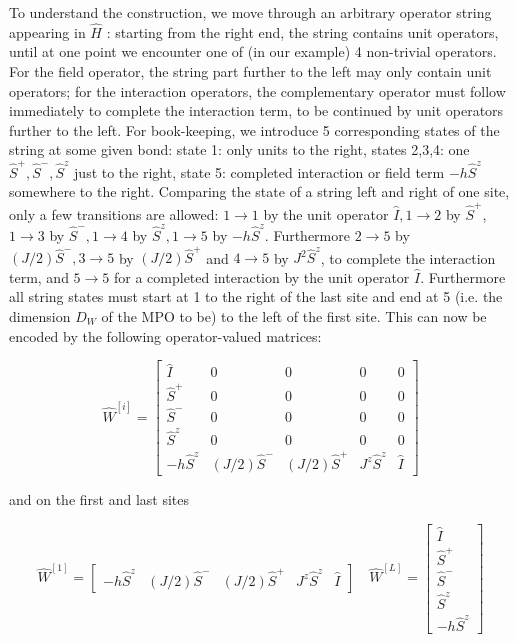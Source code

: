 \documentclass[12pt]{article}
\begin{document}
To understand the construction, we move through an arbitrary operator string appearing in $\hat{H}$ : starting from the right end, the string contains unit operators, until at one point we encounter one of (in our example) 4 non-trivial operators. For the field operator, the string part further to the left may only contain unit operators; for the interaction operators, the complementary operator must follow immediately to complete the interaction term, to be continued by unit operators further to the left. For book-keeping, we introduce 5 corresponding states of the string at some given bond: state 1: only units to the right, states 2,3,4: one $\hat{S}^{+}, \hat{S}^{-}, \hat{S}^{z}$ just to the right, state 5: completed interaction or field term $-h \hat{S}^{z}$ somewhere to the right. Comparing the state of a string left and right of one site, only a few transitions are allowed: $1 \rightarrow 1$ by the unit operator $\hat{I}, 1 \rightarrow 2$ by $\hat{S}^{+}$, $1 \rightarrow 3$ by $\hat{S}^{-}, 1 \rightarrow 4$ by $\hat{S}^{z}, 1 \rightarrow 5$ by $-h \hat{S}^{z}$. Furthermore $2 \rightarrow 5$ by $(J / 2) \hat{S}^{-}, 3 \rightarrow 5$ by $(J / 2) \hat{S}^{+}$ and $4 \rightarrow 5$ by $J^{2} \hat{S}^{z}$, to complete the interaction term, and $5 \rightarrow 5$ for a completed interaction by the unit operator $\hat{I}$. Furthermore all string states must start at 1 to the right of the last site and end at 5 (i.e. the dimension $D_{W}$ of the MPO to be) to the left of the first site. This can now be encoded by the following operator-valued matrices:

\[
\hat{W}^{[i]}=\left[\begin{array}{ccccc}
\hat{I} & 0 & 0 & 0 & 0  \tag{184}\\
\hat{S}^{+} & 0 & 0 & 0 & 0 \\
\hat{S}^{-} & 0 & 0 & 0 & 0 \\
\hat{S}^{z} & 0 & 0 & 0 & 0 \\
-h \hat{S}^{z} & (J / 2) \hat{S}^{-} & (J / 2) \hat{S}^{+} & J^{z} \hat{S}^{z} & \hat{I}
\end{array}\right]
\]

and on the first and last sites

\[
\hat{W}^{[1]}=\left[\begin{array}{lllll}
-h \hat{S}^{z} & (J / 2) \hat{S}^{-} & (J / 2) \hat{S}^{+} & J^{z} \hat{S}^{z} & \hat{I}
\end{array}\right] \quad \hat{W}^{[L]}=\left[\begin{array}{c}
\hat{I}  \tag{185}\\
\hat{S}^{+} \\
\hat{S}^{-} \\
\hat{S}^{z} \\
-h \hat{S}^{z}
\end{array}\right]
\]
\end{document}

